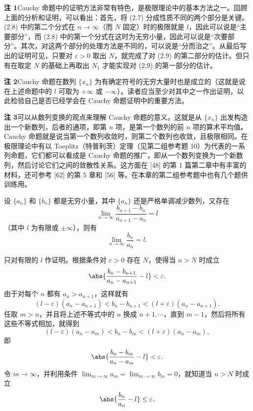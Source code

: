 \begin{xremark}
\textbf{注 1}\quad Cauchy 命题中的证明方法非常有特色，是极限理论中的基本方法之一。回顾上面的分析和证明，可以看出：首先，将 (2.7) 分成性质不同的两个部分是关键。(2.8) 中的第二个分式在 $n\to\infty$（而 $N$ 固定）时的极限就是 $l$，因此可以说是“主要部分”，而 (2.8) 中的第一个分式在这时为无穷小量，因此可以说是“次要部分”。其次，对这两个部分的处理方法是不同的，可以说是“分而治之”。从最后写出的证明可见，只要对 $\varepsilon>0$ 取出 $N$，就完成了对 (2.9) 的第二部分的估计。但只有在取定 $N$ 的基础上再取出 $N_1$ 才能实现对 (2.9) 的第一部分的估计。

\textbf{注 2}\quad Cauchy 命题在数列 $\{x_n\}$ 为有确定符号的无穷大量时也是成立的（这就是说在上述命题中的 $l$ 可取为 $+\infty$ 或 $-\infty$）。读者应当至少对其中之一作出证明，以此检验自己是否已经学会在 Cauchy 命题证明中的重要方法。

\textbf{注 3}\quad 可以从数列变换的观点来理解 Cauchy 命题的意义。这就是从 $\{x_n\}$ 出发构造出一个新数列，后者的通项，即第 $n$ 项，是第一个数列的前 $n$ 项的算术平均值。Cauchy 命题就是说当第一个数列收敛时，则第二个数列也收敛，且极限相同。在极限理论中有以 Toeplitz（特普利茨）定理（见第二组参考题 10）为代表的一系列命题，它们都可以看成是 Cauchy 命题的推广，即从一个数列变换为一个新数列，然后讨论它们之间的敛散性关系。这方面在 [48] 的第 1 篇第二章中有丰富的材料，还可参考 [62] 的第 5 章和 [56] 等。在本章的第二组参考题中也有几个题供训练用。
\end{xremark}

\begin{xproposition}
设 $\{a_n\}$ 和 $\{b_n\}$ 都是无穷小量，其中 $\{a_n\}$ 还是严格单调减少数列，又存在
\[
  \lim_{n\to\infty}\frac{b_{n+1}-b_n}{a_{n+1}-a_n}=l
\]
（其中 $l$ 为有限或 $\pm\infty$），则有
\[
  \lim_{n\to\infty}\frac{b_n}{a_n}=l.
\]
\end{xproposition}
\begin{xproof}
只对有限的 $l$ 作证明。根据条件对 $\varepsilon>0$ 存在 $N$，使得当 $n>N$ 时成立
\[
  \abs{\frac{b_n-b_{n+1}}{a_n-a_{n+1}}-l}<\varepsilon.
\]
由于对每个 $n$ 都有 $a_n>a_{n+1}$，这样就有
\[
  (l-\varepsilon)(a_n-a_{n+1})<b_n-b_{n+1}<(l+\varepsilon)(a_n-a_{n+1}).
\]
任取 $m>n$，并且将上述不等式中的 $n$ 换成 $n+1,\cdots$，直到 $m-1$，然后将所有这些不等式相加，就得到
\[
  (l-\varepsilon)(a_n-a_m)<b_n-b_m<(l+\varepsilon)(a_n-a_m),
\]
即
\[
  \abs{\frac{b_n-b_m}{a_n-a_m}-l}<\varepsilon.
\]
令 $m\to\infty$，并利用条件 $\displaystyle\lim_{m\to\infty}a_m=\lim_{m\to\infty}b_m=0$，就知道当 $n>N$ 时成立
\[
  \abs{\frac{b_n}{a_n}-l}\le\varepsilon.
\]
\end{xproof}

